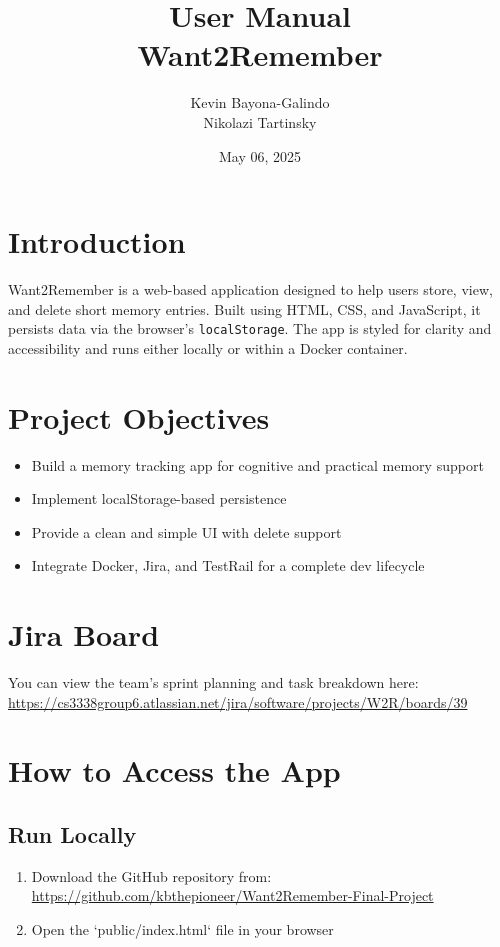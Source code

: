\documentclass[12pt]{article}
\title{\Huge User Manual\\[0.5em]\LARGE Want2Remember}
\author{Kevin Bayona-Galindo \\ Nikolazi Tartinsky}
\date{May 06, 2025}
\begin{document}
\maketitle
\tableofcontents
\newpage

\section{Introduction}
Want2Remember is a web-based application designed to help users store, view, and delete short memory entries. Built using HTML, CSS, and JavaScript, it persists data via the browser’s \texttt{localStorage}. The app is styled for clarity and accessibility and runs either locally or within a Docker container.

\section{Project Objectives}
\begin{itemize}
  \item Build a memory tracking app for cognitive and practical memory support
  \item Implement localStorage-based persistence
  \item Provide a clean and simple UI with delete support
  \item Integrate Docker, Jira, and TestRail for a complete dev lifecycle
\end{itemize}

\section{Jira Board}
You can view the team's sprint planning and task breakdown here:  
\url{https://cs3338group6.atlassian.net/jira/software/projects/W2R/boards/39}

\section{How to Access the App}
\subsection*{Run Locally}
\begin{enumerate}
  \item Download the GitHub repository from:  
  \url{https://github.com/kbthepioneer/Want2Remember-Final-Project}
  \item Open the `public/index.html` file in your browser
\end{enumerate}
\end{document}

